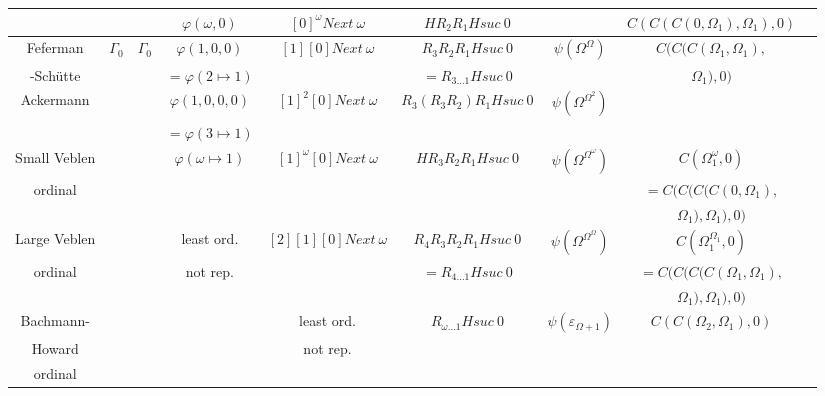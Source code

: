 \documentclass[8pt]{article}
\begin{document}
\begin{tabular}{|c|c|c|c|c|c|c|c|c|}
		&			&			& \(\varphi(\omega,0)\)		& \([0]^\omega Next\ \omega\) & \(H R_2 R_1 H suc\ 0\)&					& \(C(C(C(0,\Omega_1),\Omega_1),0)\) \\ \hline
Feferman	& \(\Gamma_0\)		
								& \(\Gamma_0\)			& \(\varphi(1,0,0)\)		& \([1] [0] Next\ \omega\)	& \(R_3 R_2 R_1 H suc\ 0\) & \(\psi(\Omega^\Omega)\)		& \(C(C(C(\Omega_1,\Omega_1),\) \\ 
-Schütte	&			&				& \(=\varphi(2 \mapsto 1)\)	&				& \(= R_{3 \ldots 1} H suc\ 0\) & 					& \(\Omega_1),0)\)		\\ \hline
Ackermann	&			&				& \(\varphi(1,0,0,0)\)		& \([1]^2 [0] Next\ \omega\) & \(R_3 (R_3 R_2) R_1 H suc\ 0\) & \(\psi(\Omega^{\Omega^2})\)		&				\\ 
		&			&				& \(=\varphi(3 \mapsto 1)\)	&				&			&					&				\\ \hline
Small Veblen	&			&				& \(\varphi(\omega \mapsto 1)\)	& \([1]^\omega [0] Next\ \omega\) & \(H R_3 R_2 R_1 H suc\ 0\) & \(\psi(\Omega^{\Omega^\omega})\)	& \(C(\Omega_1^\omega,0)\)	\\
ordinal		&			&				&				&				&			&					& \(=C(C(C(C(0,\Omega_1), \)	\\ 
		&			&				&				&				&			&					& \(\Omega_1),\Omega_1),0)\)	\\ \hline
Large Veblen	&			&				& least ord.	 	 	& \([2] [1] [0] Next\ \omega\)	& \(R_4 R_3 R_2 R_1 H suc\ 0\) & \(\psi(\Omega^{\Omega^\Omega})\)	& \(C(\Omega_1^{\Omega_1},0)\)	\\
ordinal		&			&				& not rep.			&				& \(= R_{4 \ldots 1} H suc\ 0\) &					& \(=C(C(C(C(\Omega_1,\Omega_1),\) \\ 
		&			&				&				&				&			&					& \( \Omega_1),\Omega_1),0) \)	\\ \hline
Bachmann-	&			&				&				& least ord.			& \(R_{\omega \ldots 1} H suc\ 0\) & \(\psi(\varepsilon_{\Omega+1})\)	& \(C(C(\Omega_2,\Omega_1),0)\)	\\
Howard		&			&				&				& not rep.			&			&					&				\\ 
ordinal		&			&				&				&				&			&					&				\\ \hline
  
\end{tabular}
\end{document}
